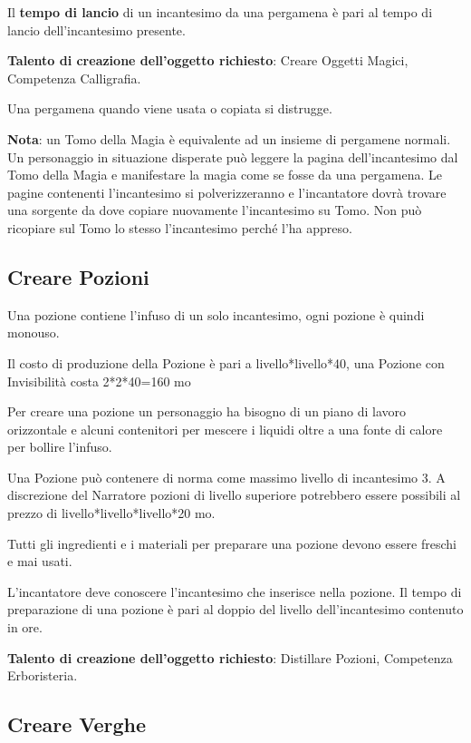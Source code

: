 \begin{multicols}{2}
Il \textbf{tempo di lancio} di un incantesimo da una pergamena è pari al tempo di lancio dell'incantesimo presente.

\textbf{Talento di creazione dell'oggetto richiesto}: Creare Oggetti Magici, Competenza Calligrafia.

Una pergamena quando viene usata o copiata si distrugge.

\textbf{Nota}: un Tomo della Magia è equivalente ad un insieme di pergamene normali. Un personaggio in situazione disperate può leggere la pagina dell'incantesimo dal Tomo della Magia e manifestare la magia come se fosse da una pergamena. Le pagine contenenti l'incantesimo si polverizzeranno e l'incantatore dovrà trovare una sorgente da dove copiare nuovamente l'incantesimo su Tomo. Non può ricopiare sul Tomo lo stesso l'incantesimo perché l'ha appreso. 

\subsection{Creare Pozioni}\label{crearepozioni}\hypertarget{crearepozioni}{}

Una pozione contiene l'infuso di un solo incantesimo, ogni pozione è quindi monouso.

\medskip

Il costo di produzione della Pozione è pari a livello*livello*40, una Pozione con Invisibilità costa 2*2*40=160 mo

\medskip

Per creare una pozione un personaggio ha bisogno di un piano di lavoro orizzontale e alcuni contenitori per mescere i liquidi oltre a una fonte di calore per bollire l'infuso.

Una Pozione può contenere di norma come massimo livello di incantesimo 3. A discrezione del Narratore pozioni di livello superiore potrebbero essere possibili al prezzo di livello*livello*livello*20 mo.

Tutti gli ingredienti e i materiali per preparare una pozione devono essere freschi e mai usati.

L'incantatore deve conoscere l'incantesimo che inserisce nella pozione. Il tempo di preparazione di una pozione è pari al doppio del livello dell'incantesimo contenuto in ore.

\textbf{Talento di creazione dell'oggetto richiesto}: Distillare Pozioni, Competenza Erboristeria.

\subsection{Creare Verghe}\label{creareverghe}


\end{multicols}
